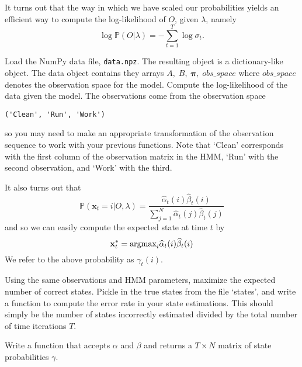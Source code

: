 It turns out that the way in which we have scaled our probabilities yields an efficient way to compute the log-likelihood of $O$, given $\lambda$, namely
$$\log \mathbb{P}(O | \lambda) = - \sum_{t=1}^{T} \log \sigma_{t}.$$

\begin{problem}
Load the NumPy data file, \texttt{data.npz}.  The resulting object is a dictionary-like object. The data object contains they arrays $A, \; B, \; \mathbf{\pi}, \; obs\_space$ where $obs\_space$ denotes the observation space for the model. Compute the log-likelihood of the data given the model. The observations come from the observation space
\begin{verbatim}
('Clean', 'Run', 'Work')
\end{verbatim}
so you may need to make an appropriate transformation of the observation sequence to work with your previous functions. Note that `Clean' corresponds with the first column of the observation matrix in the HMM, `Run' with the second observation, and `Work' with the third.
\end{problem}

It also turns out that 
\begin{equation*}
\mathbb{P}(\mathbf{x}_{t} = i | O, \lambda) = \frac{\widehat{\alpha}_{t}(i)\widehat{\beta}_{t}(i)}{\sum_{j=1}^{N} \widehat{\alpha}_{t}(j)\widehat{\beta}_{t}(j)}
\end{equation*}
and so we can easily compute the expected state at time $t$ by
\begin{equation*}
\mathbf{x}_{t}^{*} = \mbox{argmax}_{i} \widehat{\alpha}_{t}(i) \widehat{\beta}_{t}(i)
\end{equation*}
We refer to the above probability as $\gamma_{t}(i)$.

\begin{problem}
Using the same observations and HMM parameters, maximize the expected number of correct states. Pickle in the true states from the file `states', and write a function to compute the error rate in your state estimations. This should simply be the number of states incorrectly estimated divided by the total number of time iterations $T$.
\end{problem}

\begin{problem}
Write a function that accepts $\alpha$ and $\beta$ and returns a $T \times N$ matrix of state probabilities $\gamma$.
\end{problem}